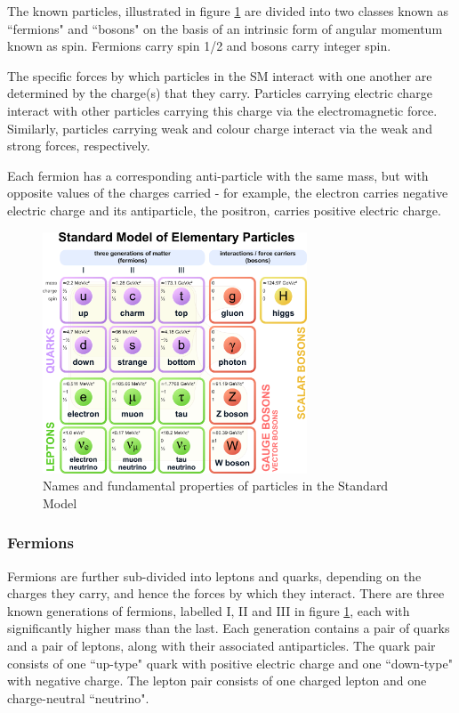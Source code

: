 \documentclass[12pt]{article}
\begin{document}
The known particles, illustrated in figure \ref{fig:standard_model} are divided into two classes known as ``fermions" and ``bosons" on the basis of an intrinsic form of angular momentum known as spin. Fermions carry spin 1/2 and bosons carry integer spin. 

The specific forces by which particles in the SM interact with one another are determined by the charge(s) that they carry. Particles carrying electric charge interact with other particles carrying this charge via the electromagnetic force. Similarly, particles carrying weak and colour charge interact via the weak and strong forces, respectively. 

Each fermion has a corresponding anti-particle with the same mass, but with opposite values of the charges carried - for example, the electron carries negative electric charge and its antiparticle, the positron, carries positive electric charge. 

\begin{figure}[H]
	\centering
	\includegraphics[width=0.7\textwidth]{figures/StandardModel.png}
	\caption[]{Names and fundamental properties of particles in the Standard Model}
	\label{fig:standard_model}
\end{figure}

\subsubsection{Fermions}

Fermions are further sub-divided into leptons and quarks, depending on the charges they carry, and hence the forces by which they interact. There are three known generations of fermions, labelled I, II and III in figure \ref{fig:standard_model}, each with significantly higher mass than the last. Each generation contains a pair of quarks and a pair of leptons, along with their associated antiparticles. The quark pair consists of one ``up-type" quark with positive electric charge and one ``down-type" with negative charge. The lepton pair consists of one charged lepton and one charge-neutral ``neutrino". 
\end{document}
